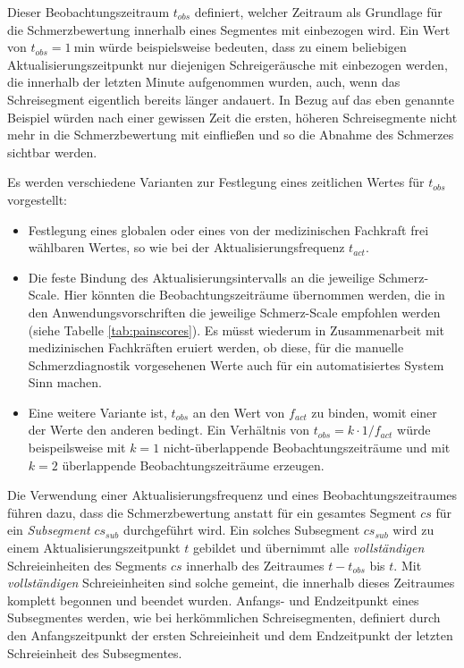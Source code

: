 Dieser Beobachtungszeitraum $t_{obs}$ definiert, welcher Zeitraum als Grundlage für die Schmerzbewertung innerhalb eines Segmentes mit einbezogen wird. Ein Wert von $t_{obs} = \SI{1}{\minute}$ würde beispielsweise bedeuten, dass  zu einem beliebigen Aktualisierungszeitpunkt nur diejenigen Schreigeräusche mit einbezogen werden, die innerhalb der letzten Minute aufgenommen wurden, auch, wenn das Schreisegment eigentlich bereits länger andauert. In Bezug auf das eben genannte Beispiel würden nach einer gewissen Zeit die ersten, höheren Schreisegmente nicht mehr in die Schmerzbewertung mit einfließen und so die Abnahme des Schmerzes sichtbar werden.

Es werden verschiedene Varianten zur Festlegung eines zeitlichen Wertes für $t_{obs}$ vorgestellt:
\begin{itemize}
\item Festlegung eines globalen oder eines von der medizinischen Fachkraft frei wählbaren Wertes, so wie bei der Aktualisierungsfrequenz $t_{act}$.
\item Die feste Bindung des Aktualisierungsintervalls an die jeweilige Schmerz-Scale. Hier könnten die Beobachtungszeiträume übernommen werden, die in den Anwendungsvorschriften die jeweilige Schmerz-Scale empfohlen werden (siehe Tabelle \ref{tab:painscores}). Es müsst wiederum in Zusammenarbeit mit medizinischen Fachkräften eruiert werden, ob diese, für die manuelle Schmerzdiagnostik vorgesehenen Werte auch für ein automatisiertes System Sinn machen.
\item Eine weitere Variante ist, $t_{obs}$ an den Wert von $f_{act}$ zu binden, womit einer der Werte den anderen bedingt. Ein Verhältnis von $t_{obs} = k \cdot 1/f_{act}$ würde beispeilsweise mit $k=1$ nicht-überlappende Beobachtungszeiträume und  mit $k=2$ überlappende Beobachtungszeiträume erzeugen.
\end{itemize}

Die Verwendung einer Aktualisierungsfrequenz und eines Beobachtungszeitraumes führen dazu, dass die Schmerzbewertung anstatt für ein gesamtes Segment $cs$ für ein \emph{Subsegment} $cs_{sub}$ durchgeführt wird. Ein solches Subsegment $cs_{sub}$ wird zu einem Aktualisierungszeitpunkt $t$ gebildet und übernimmt alle \emph{vollständigen} Schreieinheiten des Segments $cs$ innerhalb des Zeitraumes $t - t_{obs}$ bis $t$. Mit \emph{vollständigen} Schreieinheiten sind solche gemeint, die innerhalb dieses Zeitraumes komplett begonnen und beendet wurden. Anfangs- und Endzeitpunkt eines Subsegmentes werden, wie bei herkömmlichen Schreisegmenten, definiert durch den Anfangszeitpunkt der ersten Schreieinheit und dem Endzeitpunkt der letzten Schreieinheit des Subsegmentes. 

